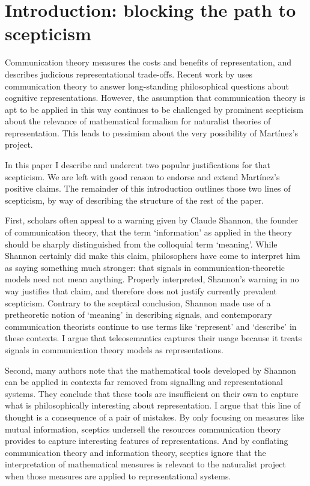 \section{Introduction: blocking the path to scepticism}\label{sec:intro}

Communication theory measures the costs and benefits of representation, and describes judicious representational trade-offs. 
Recent work by \citet{martinez2019deception,martinez2019representations} uses communication theory to answer long-standing philosophical questions about cognitive representations.
However, the assumption that communication theory is apt to be applied in this way continues to be challenged by prominent scepticism about the relevance of mathematical formalism for naturalist theories of representation.
This leads to pessimism about the very possibility of Mart\'{i}nez's project.

In this paper I describe and undercut two popular justifications for that scepticism.
We are left with good reason to endorse and extend Mart\'{i}nez's positive claims.
The remainder of this introduction outlines those two lines of scepticism, by way of describing the structure of the rest of the paper.

First, scholars often appeal to a warning given by Claude Shannon, the founder of communication theory, that the term `information' as applied in the theory should be sharply distinguished from the colloquial term `meaning'.
While Shannon certainly did make this claim, philosophers have come to interpret him as saying something much stronger: that signals in communication-theoretic models need not mean anything.
Properly interpreted, Shannon's warning in no way justifies that claim, and therefore does not justify currently prevalent scepticism.
Contrary to the sceptical conclusion, Shannon made use of a pretheoretic notion of `meaning' in describing signals, and contemporary communication theorists continue to use terms like `represent' and `describe' in these contexts.
I argue that teleosemantics captures their usage because it treats signals in communication theory models as representations.

Second, many authors note that the mathematical tools developed by Shannon can be applied in contexts far removed from signalling and representational systems.
They conclude that these tools are insufficient on their own to capture what is philosophically interesting about representation.
I argue that this line of thought is a consequence of a pair of mistakes.
By only focusing on measures like mutual information, sceptics undersell the resources communication theory provides to capture interesting features of representations.
And by conflating communication theory and information theory, sceptics ignore that the interpretation of mathematical measures is relevant to the naturalist project when those measures are applied to representational systems.

